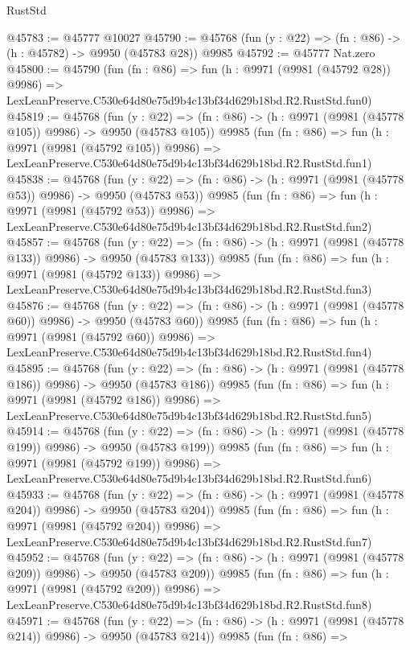 \begin{lexlean}{RustStd}
\begin{coremodule}
@45783 := @45777 @10027
@45790 := @45768 (fun (y : @22) => (fn : @86) -> (h : @45782) -> @9950 (@45783 @28)) @9985
@45792 := @45777 Nat.zero
@45800 := @45790
    (fun (fn : @86) =>
    fun (h : @9971 (@9981 (@45792 @28)) @9986) =>
    LexLeanPreserve.C530e64d80e75d9b4c13bf34d629b18bd.R2.RustStd.fun0)
@45819 := @45768
    (fun (y : @22) => (fn : @86) -> (h : @9971 (@9981 (@45778 @105)) @9986) -> @9950 (@45783 @105))
    @9985
    (fun (fn : @86) =>
    fun (h : @9971 (@9981 (@45792 @105)) @9986) =>
    LexLeanPreserve.C530e64d80e75d9b4c13bf34d629b18bd.R2.RustStd.fun1)
@45838 := @45768
    (fun (y : @22) => (fn : @86) -> (h : @9971 (@9981 (@45778 @53)) @9986) -> @9950 (@45783 @53))
    @9985
    (fun (fn : @86) =>
    fun (h : @9971 (@9981 (@45792 @53)) @9986) =>
    LexLeanPreserve.C530e64d80e75d9b4c13bf34d629b18bd.R2.RustStd.fun2)
@45857 := @45768
    (fun (y : @22) => (fn : @86) -> (h : @9971 (@9981 (@45778 @133)) @9986) -> @9950 (@45783 @133))
    @9985
    (fun (fn : @86) =>
    fun (h : @9971 (@9981 (@45792 @133)) @9986) =>
    LexLeanPreserve.C530e64d80e75d9b4c13bf34d629b18bd.R2.RustStd.fun3)
@45876 := @45768
    (fun (y : @22) => (fn : @86) -> (h : @9971 (@9981 (@45778 @60)) @9986) -> @9950 (@45783 @60))
    @9985
    (fun (fn : @86) =>
    fun (h : @9971 (@9981 (@45792 @60)) @9986) =>
    LexLeanPreserve.C530e64d80e75d9b4c13bf34d629b18bd.R2.RustStd.fun4)
@45895 := @45768
    (fun (y : @22) => (fn : @86) -> (h : @9971 (@9981 (@45778 @186)) @9986) -> @9950 (@45783 @186))
    @9985
    (fun (fn : @86) =>
    fun (h : @9971 (@9981 (@45792 @186)) @9986) =>
    LexLeanPreserve.C530e64d80e75d9b4c13bf34d629b18bd.R2.RustStd.fun5)
@45914 := @45768
    (fun (y : @22) => (fn : @86) -> (h : @9971 (@9981 (@45778 @199)) @9986) -> @9950 (@45783 @199))
    @9985
    (fun (fn : @86) =>
    fun (h : @9971 (@9981 (@45792 @199)) @9986) =>
    LexLeanPreserve.C530e64d80e75d9b4c13bf34d629b18bd.R2.RustStd.fun6)
@45933 := @45768
    (fun (y : @22) => (fn : @86) -> (h : @9971 (@9981 (@45778 @204)) @9986) -> @9950 (@45783 @204))
    @9985
    (fun (fn : @86) =>
    fun (h : @9971 (@9981 (@45792 @204)) @9986) =>
    LexLeanPreserve.C530e64d80e75d9b4c13bf34d629b18bd.R2.RustStd.fun7)
@45952 := @45768
    (fun (y : @22) => (fn : @86) -> (h : @9971 (@9981 (@45778 @209)) @9986) -> @9950 (@45783 @209))
    @9985
    (fun (fn : @86) =>
    fun (h : @9971 (@9981 (@45792 @209)) @9986) =>
    LexLeanPreserve.C530e64d80e75d9b4c13bf34d629b18bd.R2.RustStd.fun8)
@45971 := @45768
    (fun (y : @22) => (fn : @86) -> (h : @9971 (@9981 (@45778 @214)) @9986) -> @9950 (@45783 @214))
    @9985
    (fun (fn : @86) =>

\end{coremodule}
\end{lexlean}
